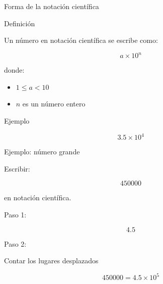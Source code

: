 \documentclass[aspectratio=169,10pt,handout]{beamer}
\newcommand{\pp}{\pause}
\begin{document}
	\begin{frame}{Forma de la notación científica}
		
		\begin{block}{Definición}
			
			Un número en notación científica se escribe como:
			
			\[
			a \times 10^n
			\]
			
			donde:
			
			\begin{itemize}
				\item \(1 \le a < 10\)
				\item \(n\) es un número entero
			\end{itemize}
			
		\end{block}
		
		\pp
		
		\begin{exampleblock}{Ejemplo}
			
			\[
			3.5 \times 10^4
			\]
			
		\end{exampleblock}
		
	\end{frame}
	
	\begin{frame}{Ejemplo: número grande}
		
		Escribir:
		
		\[
		450000
		\]
		
		en notación científica.
		
		\pp
		
		Paso 1:
		
		\[
		4.5
		\]
		
		\pp
		
		Paso 2:
		
		Contar los lugares desplazados
		
		\[
		450000 = 4.5 \times 10^5
		\]
		
	\end{frame}
	
\end{document}
